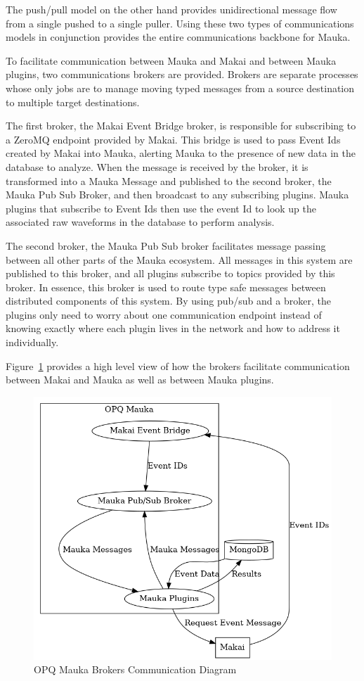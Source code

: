 The push/pull model on the other hand provides unidirectional message flow from a single pushed to a single puller. Using these two types of communications models in conjunction provides the entire communications backbone for Mauka.

To facilitate communication between Mauka and Makai and between Mauka plugins, two communications brokers are provided. Brokers are separate processes whose only jobs are to manage moving typed messages from a source destination to multiple target destinations.

The first broker, the Makai Event Bridge broker, is responsible for subscribing to a ZeroMQ endpoint provided by Makai. This bridge is used to pass Event Ids created by Makai into Mauka, alerting Mauka to the presence of new data in the database to analyze. When the message is received by the broker, it is transformed into a Mauka Message and published to the second broker, the Mauka Pub Sub Broker, and then broadcast to any subscribing plugins. Mauka plugins that subscribe to Event Ids then use the event Id to look up the associated raw waveforms in the database to perform analysis.

The second broker, the Mauka Pub Sub broker facilitates message passing between all other parts of the Mauka ecosystem. All messages in this system are published to this broker, and all plugins subscribe to topics provided by this broker. In essence, this broker is used to route type safe messages between distributed components of this system. By using pub/sub and a broker, the plugins only need to worry about one communication endpoint instead of knowing exactly where each plugin lives in the network and how to address it individually.

Figure~\ref{fig:mauka_brokers} provides a high level view of how the brokers facilitate communication between Makai and Mauka as well as between Mauka plugins.

\begin{figure}
	\centering
	\includegraphics[width=\linewidth]{figures/mauka_brokers_communication.png}
	\caption{OPQ Mauka Brokers Communication Diagram}
	\label{fig:mauka_brokers}
\end{figure}

